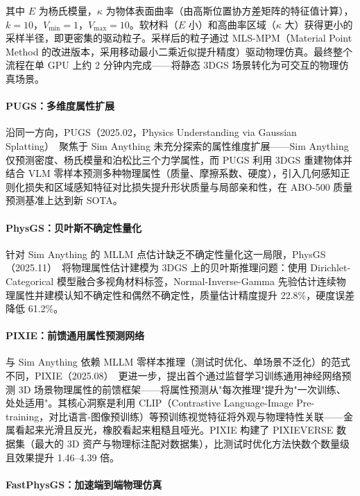 其中 $E$ 为杨氏模量，$\kappa$ 为物体表面曲率（由高斯位置协方差矩阵的特征值计算），$k=10$，$V_{\min}=1$，$V_{\max}=10$。软材料（$E$ 小）和高曲率区域（$\kappa$ 大）获得更小的采样半径，即更密集的驱动粒子。采样后的粒子通过 MLS-MPM（Material Point Method 的改进版本，采用移动最小二乘近似提升精度）驱动物理仿真。最终整个流程在单 GPU 上约 2 分钟内完成——将静态 3DGS 场景转化为可交互的物理仿真场景。

\paragraph{PUGS：多维度属性扩展}

沿同一方向，PUGS（2025.02，Physics Understanding via Gaussian Splatting）~\cite{2502_12231}聚焦于 Sim Anything 未充分探索的属性维度扩展——Sim Anything 仅预测密度、杨氏模量和泊松比三个力学属性，而 PUGS 利用 3DGS 重建物体并结合 VLM 零样本预测多种物理属性（质量、摩擦系数、硬度），引入几何感知正则化损失和区域感知特征对比损失提升形状质量与局部亲和性，在 ABO-500 质量预测基准上达到新 SOTA。

\paragraph{PhysGS：贝叶斯不确定性量化}

针对 Sim Anything 的 MLLM 点估计缺乏不确定性量化这一局限，PhysGS（2025.11）~\cite{2511_18570}将物理属性估计建模为 3DGS 上的贝叶斯推理问题：使用 Dirichlet-Categorical 模型融合多视角材料标签，Normal-Inverse-Gamma 先验估计连续物理属性并建模认知不确定性和偶然不确定性，质量估计精度提升 22.8\%，硬度误差降低 61.2\%。

\paragraph{PIXIE：前馈通用属性预测网络}

与 Sim Anything 依赖 MLLM 零样本推理（测试时优化、单场景不泛化）的范式不同，PIXIE（2025.08）~\cite{2508_17437}更进一步，提出首个通过监督学习训练通用神经网络预测 3D 场景物理属性的前馈框架——将属性预测从"每次推理"提升为"一次训练、处处适用"。其核心洞察是利用 CLIP（Contrastive Language-Image Pre-training，对比语言-图像预训练）等预训练视觉特征将外观与物理特性关联——金属看起来光滑且反光，橡胶看起来粗糙且哑光。PIXIE 构建了 PIXIEVERSE 数据集（最大的 3D 资产与物理标注配对数据集），比测试时优化方法快数个数量级且效果提升 1.46--4.39 倍。

\paragraph{FastPhysGS：加速端到端物理仿真}

